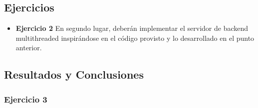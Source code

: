 
\subsection{Ejercicios}
\begin{itemize}
 \item 
\textbf{Ejercicio 2}
En segundo lugar, deberán implementar el servidor de backend multithreaded inspirándose en el código provisto y lo 
desarrollado en el punto anterior.
\end{itemize}

\subsection{Resultados y Conclusiones}


\subsubsection[Resolución Ejercicio 2]{Ejercicio 3}

